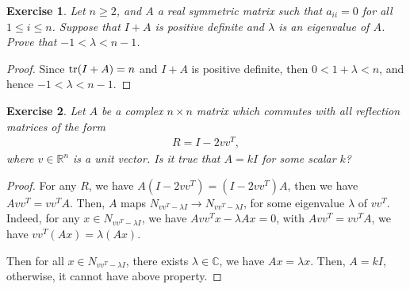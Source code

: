 \documentclass[10pt]{book}
\newtheorem{exercise}{Exercise}[section]
\theoremstyle{definition}
\numberwithin{equation}{chapter}
\begin{document}
\medskip

\begin{exercise}
Let $n \geq 2$, and $A$ a real symmetric matrix such that $a_{ii} = 0$ for all $1 \leq i \leq n$. Suppose that $I + A$ is positive definite and $\lambda$ is an eigenvalue of $A$. Prove that $-1 < \lambda < n - 1$.
\end{exercise}
\begin{proof}
Since $\tr(I + A) = n$ and $I + A$ is positive definite, then $0 < 1 + \lambda < n$, and hence $-1 < \lambda < n - 1$.
\end{proof}

\medskip

\begin{exercise}
Let $A$ be a complex $n \times n$ matrix which commutes with all reflection matrices of the form
\begin{align*}
    R = I - 2 v v^T,
\end{align*}
where $v \in \mathbb{R}^n$ is a unit vector. Is it true that $A = kI$ for some scalar $k$?
\end{exercise}
\begin{proof}
For any $R$, we have $A \left(I - 2 v v^T\right) = \left(I - 2 v v^T\right) A$, then we have $A v v^T = v v^T A$. Then, $A$ maps $N_{v v^T - \lambda I} \to N_{v v^T - \lambda I}$, for some eigenvalue $\lambda$ of $v v^T$. Indeed, for any $x \in N_{v v^T - \lambda I}$, we have $A v v^T x - \lambda Ax = 0$, with $A v v^T = v v^T A$, we have $v v^T(Ax) = \lambda (Ax)$.

Then for all $x\in N_{v v^T - \lambda I}$, there exists $\lambda \in \mathbb{C}$, we have $Ax = \lambda x$. Then, $A = kI$, otherwise, it cannot have above property.
\end{proof}

\medskip
\end{document}
